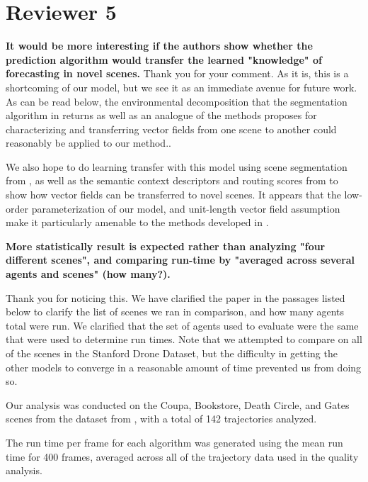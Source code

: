 \documentclass[usenames,dvipsnames]{article}
\providecommand{\response}[1]{
\noindent
\noindent\colorbox{gray!20}{
\parbox{\textwidth}{
\setlength{\parskip}{.1in}
\setlength{\parindent}{.1in}
#1}
}
}
\begin{document}
\section*{Reviewer 5}
\begin{enumerate}
\begin{item}
\textbf{
It would be more interesting if the authors show whether
the prediction algorithm would transfer the learned "knowledge" of
forecasting in novel scenes.}
Thank you for your comment. As it is, this is a shortcoming of our model, but we see it as an immediate avenue for future work. As can be read below, the environmental decomposition that the segmentation algorithm in \cite{Walker2014} returns as well as an analogue of the methods \cite{Ballan2016} proposes for characterizing and transferring vector fields from one scene to another could reasonably be applied to our method..

\response{We also hope to do learning transfer with this model using scene segmentation from \cite{Walker2014}, as well as the semantic context descriptors and routing scores from \cite{Ballan2016} to show how vector fields can be transferred to novel scenes. It appears that the low-order parameterization of our model, and unit-length vector field assumption make it particularly amenable to the methods developed in \cite{Ballan2016}.}


\end{item}
\begin{item}
\textbf{
More statistically result is expected
rather than analyzing "four different scenes", and comparing run-time
by "averaged across several agents and scenes" (how many?).}

Thank you for noticing this. We have clarified the paper in the passages listed below to clarify the list of scenes we ran in comparison, and how many agents total were run. We clarified that the set of agents used to evaluate were the same that were used to determine run times. Note that we attempted to compare on all of the scenes in the Stanford Drone Dataset, but the difficulty in getting the other models to converge in a reasonable amount of time prevented us from doing so.

\reversemarginpar{}
\response{ Our analysis was conducted on the Coupa, Bookstore, Death Circle, and Gates scenes from the dataset from \cite{Robicquet2016}, with a total of 142 trajectories analyzed.}

\reversemarginpar{}
\response{The run time per frame for each algorithm was generated using the mean run time for 400 frames, averaged across all of the trajectory data used in the quality analysis.}
\end{item}


\end{enumerate}
\end{document}
